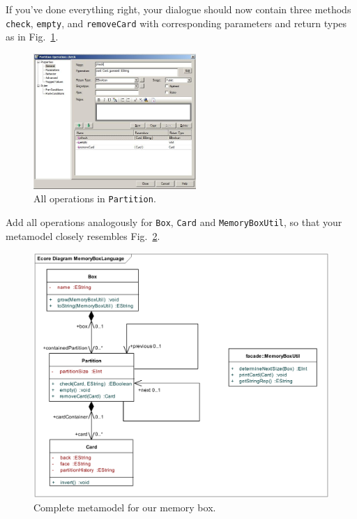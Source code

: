 If you've done everything right, your dialogue should
now contain three methods \texttt{check}, \texttt{empty}, and
\texttt{removeCard} with corresponding parameters and return types as in
Fig.~\ref{fig:operation_partition}.

\begin{figure}[htbp]
	\centering
  \includegraphics[width=0.55\textwidth]{pics/memBox39}
	\caption{All operations in \texttt{Partition}.}
	\label{fig:operation_partition}
\end{figure}

\clearpage

Add all operations analogously for \texttt{Box}, \texttt{Card} and
\texttt{MemoryBoxUtil}, so that your metamodel closely resembles
Fig.~\ref{fig:metamodel_complete}. 
 
\begin{figure}[htbp]
	\centering 
  \includegraphics[width=\textwidth]{pics/memBox44} 
	\caption{Complete metamodel for our memory box.}
	\label{fig:metamodel_complete}
\end{figure}


